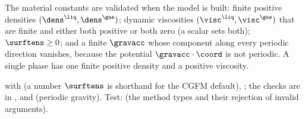 The material constants are validated when the model is built: finite
positive densities $(\dens^{\liq},\dens^{\gas})$; dynamic viscosities
$(\visc^{\liq},\visc^{\gas})$ that are finite and either both positive or
both zero (a scalar sets both); $\surftens\ge0$; and a finite $\gravacc$
whose component along every periodic direction vanishes, because the
potential $\gravacc\cdot\coord$ is not periodic. A single phase has one
finite positive density and a positive viscosity.

\begin{implnote}
with  (a number
$\surftens$ is shorthand for the CGFM default), ; the
checks are in ,
 and
 (periodic gravity). Test:
(the method types and their rejection of invalid arguments).
\end{implnote}


